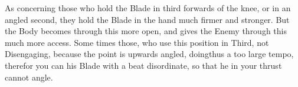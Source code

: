 
As concerning those who hold the Blade in third forwards of the knee,
or in an angled second, they hold the Blade in the hand much firmer
and stronger. But the Body becomes through this more open, and gives
the Enemy through this much more access. Some times those, who use this
position in Third, not Disengaging, because the point is upwards
angled, doingthus a too large tempo, therefor you can his Blade with a
beat disordinate, so that he in your thrust cannot angle.


